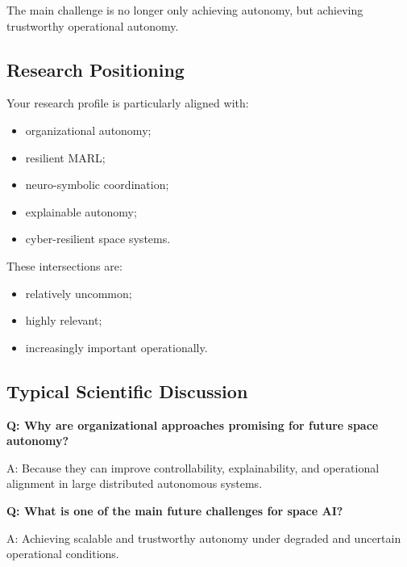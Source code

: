 \documentclass[10pt,a4paper,twocolumn]{article}
\begin{document}
\begin{warningbox}
    The main challenge is no longer only achieving autonomy, but achieving trustworthy operational autonomy.
\end{warningbox}


\subsection{Research Positioning}

Your research profile is particularly aligned with:
\begin{itemize}
    \item organizational autonomy;
    \item resilient MARL;
    \item neuro-symbolic coordination;
    \item explainable autonomy;
    \item cyber-resilient space systems.
\end{itemize}

These intersections are:
\begin{itemize}
    \item relatively uncommon;
    \item highly relevant;
    \item increasingly important operationally.
\end{itemize}


\subsection{Typical Scientific Discussion}

\begin{questionbox}
    \textbf{Q: Why are organizational approaches promising for future space autonomy?}

    A: Because they can improve controllability, explainability, and operational alignment in large distributed autonomous systems.
\end{questionbox}

\begin{questionbox}
    \textbf{Q: What is one of the main future challenges for space AI?}

    A: Achieving scalable and trustworthy autonomy under degraded and uncertain operational conditions.
\end{questionbox}
\end{document}
